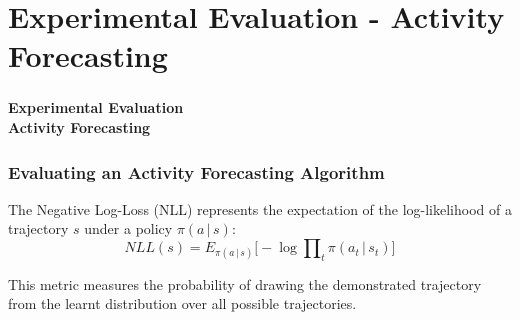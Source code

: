 \section{Experimental Evaluation - Activity Forecasting}

\begin{frame}
	\frametitle{}
	
	\Huge
	
	\vspace{0.5cm}
	
	\begin{center}
		\textbf{Experimental Evaluation\\ Activity Forecasting}
	\end{center}
\end{frame}

\begin{frame}
	\frametitle{Evaluating an Activity Forecasting Algorithm}
	
	\Large
	
	\vspace{0.45cm}
	
	The Negative Log-Loss (NLL) represents the expectation of the log-likelihood of a trajectory $ s $
	under a policy $ \pi(a \, | \, s) $:
	\vspace{-0.1cm}
	\begin{equation*}
		NLL(s) = E_{\pi(a \, | \, s)} \Big [ -\log \prod\nolimits_t \pi(a_t \, | \, s_t)  \Big ]
	\end{equation*}
	
	\vspace{0.1cm}
	
	This metric measures the probability of drawing the demonstrated trajectory from the learnt
	distribution over all possible trajectories. \\
\end{frame}

